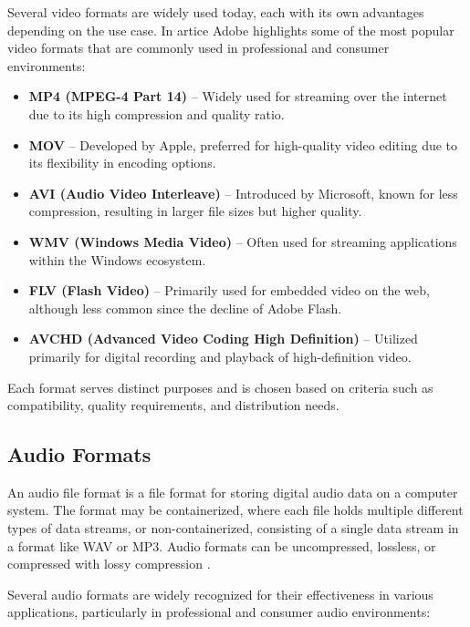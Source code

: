 Several video formats are widely used today, each with its own advantages depending on the use case. In artice \cite{AdobeVideoFormats} Adobe highlights some of the most popular video formats that are commonly used in professional and consumer environments:

\begin{itemize}
    \item \textbf{MP4 (MPEG-4 Part 14)} -- Widely used for streaming over the internet due to its high compression and quality ratio.
    \item \textbf{MOV} -- Developed by Apple, preferred for high-quality video editing due to its flexibility in encoding options.
    \item \textbf{AVI (Audio Video Interleave)} -- Introduced by Microsoft, known for less compression, resulting in larger file sizes but higher quality.
    \item \textbf{WMV (Windows Media Video)} -- Often used for streaming applications within the Windows ecosystem.
    \item \textbf{FLV (Flash Video)} -- Primarily used for embedded video on the web, although less common since the decline of Adobe Flash.
    \item \textbf{AVCHD (Advanced Video Coding High Definition)} -- Utilized primarily for digital recording and playback of high-definition video.
\end{itemize}

Each format serves distinct purposes and is chosen based on criteria such as compatibility, quality requirements, and distribution needs.

\subsection{Audio Formats}
An audio file format is a file format for storing digital audio data on a computer system. The format may be containerized, where each file holds multiple different types of data streams, or non-containerized, consisting of a single data stream in a format like WAV or MP3. Audio formats can be uncompressed, lossless, or compressed with lossy compression \cite{WikiAudioFormat}.

Several audio formats are widely recognized for their effectiveness in various applications, particularly in professional and consumer audio environments:

